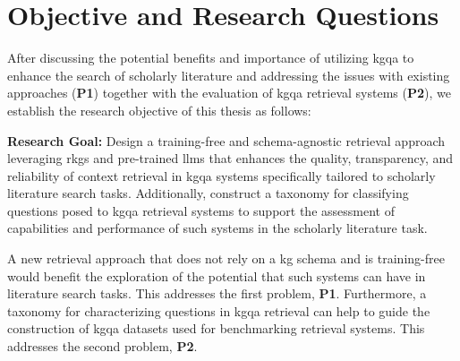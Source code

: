 




\section{Objective and Research Questions}

After discussing the potential benefits and importance of utilizing \gls{kgqa} to enhance the search of scholarly literature and addressing the issues with existing approaches (\textbf{P1}) together with the evaluation of \gls{kgqa} retrieval systems (\textbf{P2}), we establish the research objective of this thesis as follows:

\begin{tcolorbox}
    \textbf{Research Goal:} Design a training-free and schema-agnostic retrieval approach leveraging \glspl{rkg} and pre-trained \glspl{llm} that enhances the quality, transparency, and reliability of context retrieval in \gls{kgqa} systems specifically tailored to scholarly literature search tasks. Additionally, construct a taxonomy for classifying questions posed to \gls{kgqa} retrieval systems to support the assessment of capabilities and performance of such systems in the scholarly literature task.
\end{tcolorbox}

A new retrieval approach that does not rely on a \gls{kg} schema and is training-free would benefit the exploration of the potential that such systems can have in literature search tasks. This addresses the first problem, \textbf{P1}. Furthermore, a taxonomy for characterizing questions in \gls{kgqa} retrieval can help to guide the construction of \gls{kgqa} datasets used for benchmarking retrieval systems. This addresses the second problem, \textbf{P2}.

